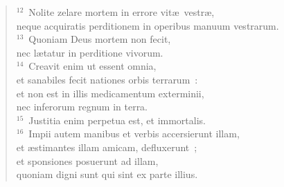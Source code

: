 \begin{flushleft}\begin{verse}${}^{12}$~Nolite zelare mortem in errore vit\ae\ vestr\ae ,\\ neque acquiratis perditionem in operibus manuum vestrarum.\\
${}^{13}$~Quoniam Deus mortem non fecit,\\ nec l\ae tatur in perditione vivorum.\\
${}^{14}$~Creavit enim ut essent omnia,\\ et sanabiles fecit nationes orbis terrarum~:\\ et non est in illis medicamentum exterminii,\\ nec inferorum regnum in terra.\\
${}^{15}$~Justitia enim perpetua est, et immortalis.\\
${}^{16}$~Impii autem manibus et verbis accersierunt illam,\\ et \ae stimantes illam amicam, defluxerunt~;\\ et sponsiones posuerunt ad illam,\\ quoniam digni sunt qui sint ex parte illius.\end{verse}\end{flushleft}


